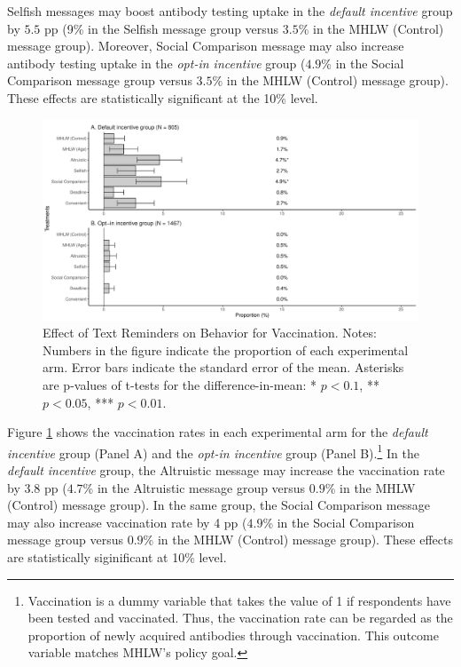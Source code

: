 \documentclass[
]{article}
\begin{document}
Selfish messages may boost antibody testing uptake in the \emph{default incentive} group by \(5.5\) pp (9\% in the Selfish message group versus \(3.5\)\% in the MHLW (Control) message group). Moreover, Social Comparison message may also increase antibody testing uptake in the \emph{opt-in incentive} group (\(4.9\)\% in the Social Comparison message group versus \(3.5\)\% in the MHLW (Control) message group). These effects are statistically significant at the 10\% level.

\begin{figure}[t]
\includegraphics{discussion-paper_files/figure-latex/ttest-act-vacc-1} \caption{Effect of Text Reminders on Behavior for Vaccination. Notes: Numbers in the figure indicate the proportion of each experimental arm. Error bars indicate the standard error of the mean. Asterisks are p-values of t-tests for the difference-in-mean: * $p < 0.1$, ** $p < 0.05$, *** $p < 0.01$.}\label{fig:ttest-act-vacc}
\end{figure}

Figure \ref{fig:ttest-act-vacc} shows the vaccination rates in each experimental arm for the \emph{default incentive} group (Panel A) and the \emph{opt-in incentive} group (Panel B).\footnote{Vaccination is a dummy variable that takes the value of 1 if respondents have been tested and vaccinated. Thus, the vaccination rate can be regarded as the proportion of newly acquired antibodies through vaccination. This outcome variable matches MHLW's policy goal.} In the \emph{default incentive} group, the Altruistic message may increase the vaccination rate by \(3.8\) pp (\(4.7\)\% in the Altruistic message group versus \(0.9\)\% in the MHLW (Control) message group). In the same group, the Social Comparison message may also increase vaccination rate by 4 pp (\(4.9\)\% in the Social Comparison message group versus \(0.9\)\% in the MHLW (Control) message group). These effects are statistically siginificant at 10\% level.
\end{document}
